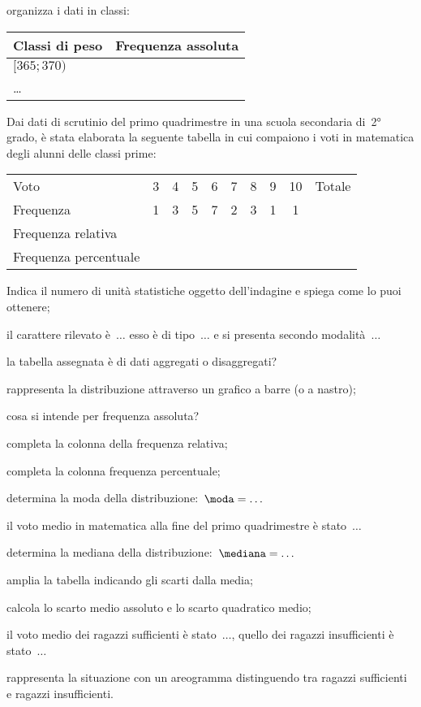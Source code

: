 \begin{esercizio}
\begin{enumeratea}
\item organizza i dati in classi:
\begin{center}
\begin{tabular}{lc}
\toprule
Classi di peso & Frequenza assoluta\\
\midrule
$[365; 370)$ & \\
\ldots & \\
\bottomrule
\end{tabular}
\end{center}
\end{enumeratea}
\end{esercizio}

\begin{esercizio}
\label{ese:A.47}
Dai dati di scrutinio del primo quadrimestre in una scuola secondaria di~2° grado, è stata elaborata la seguente tabella in cui compaiono i voti in matematica degli alunni delle classi prime:
\begin{center}
\begin{tabular}{l*{9}{c}}
\toprule
Voto&3 &4 &5 &6 &7 &8 &9 &10 &Totale\\
Frequenza &1&3&5&7&2&3&1&1&\\
Frequenza relativa&&&&&&&&&\\
Frequenza percentuale&&&&&&&&&\\
\bottomrule
\end{tabular}
\end{center}
\begin{enumeratea}
 \item Indica il numero di unità statistiche oggetto dell'indagine e spiega come lo puoi ottenere;
 \item il carattere rilevato è~$\dots$ esso è di tipo~$\dots$ e si presenta secondo modalità~$\dots$
 \item la tabella assegnata è di dati aggregati o disaggregati?
 \item rappresenta la distribuzione attraverso un grafico a barre (o a nastro);
 \item cosa si intende per frequenza assoluta?
 \item completa la colonna della frequenza relativa;
 \item completa la colonna frequenza percentuale;
 \item determina la moda della distribuzione:~$\moda = \dots$
 \item il voto medio in matematica alla fine del primo quadrimestre è stato~$\dots$
 \item determina la mediana della distribuzione:~$\mediana= \dots$
 \item amplia la tabella indicando gli scarti dalla media;
 \item calcola lo scarto medio assoluto e lo scarto quadratico medio;
 \item il voto medio dei ragazzi sufficienti è stato~$\dots$, quello dei ragazzi insufficienti è stato~$\dots$
 \item rappresenta la situazione con un areogramma distinguendo tra ragazzi sufficienti e ragazzi insufficienti.
 \end{enumeratea}
\end{esercizio}

